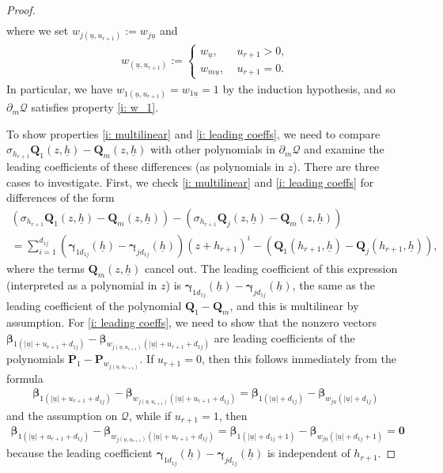 \documentclass[11pt]{amsart}
\theoremstyle{definition}
\newcommand{\CQ}{{\mathcal Q}}
\newcommand{\bp}{{\textbf{P}}}
\newcommand{\q}{{\textbf{Q}}}
\newcommand{\bgamma}{{\boldsymbol{\gamma}}}
\newcommand{\bbeta}{{\boldsymbol{\beta}}}
\newcommand{\uh}{{\underline{h}}}
\newcommand{\uu}{{\underline{u}}}
\begin{document}
\begin{proof}
\begin{multline}
        \end{multline}
        where we set $w_{j(\uu, u_{r+1})} := w_{j\uu}$ and 
        \begin{align*}
            w_{(\uu, u_{r+1})} := \begin{cases} w_\uu,\; &u_{r+1}>0,\\
            w_{m\uu},\; &u_{r+1} = 0. 
            \end{cases}
        \end{align*}
      In particular, we have $w_{1(\uu, u_{r+1})} = w_{1\uu}= 1$ by the induction hypothesis, and so $\partial_m \CQ$ satisfies property \eqref{i: w_1}.
                
        
        
        To show properties \eqref{i: multilinear} and \eqref{i: leading coeffs},
        we need to compare $\sigma_{h_{r+1}}{\q}_1(z,\uh)-{\q}_m(z,\uh)$ with other polynomials in $\partial_m \CQ$ and examine the leading coefficients of these differences (as polynomials in $z$).
       There are three cases to investigate. First, we check \eqref{i: multilinear} and \eqref{i: leading coeffs} for differences of the form
        \begin{multline}\label{E: first case PET}
            (\sigma_{h_{r+1}}{\q}_1(z,\uh)-{\q}_m(z,\uh)) - (\sigma_{h_{r+1}}{\q}_j(z,\uh)-{\q}_m(z,\uh))\\
            = \sum_{i=1}^{d_{1j}}(\bgamma_{1d_{1j}}(\uh)-\bgamma_{jd_{1j}}(\uh))(z+h_{r+1})^i - (\q_1(h_{r+1},\uh) - \q_j(h_{r+1},\uh)),
        \end{multline}
        where the terms ${\q}_m(z,\uh)$ cancel out.
        The leading coefficient of this expression (interpreted as a polynomial in $z$) is $\bgamma_{1d_{1j}}(\uh)-\bgamma_{jd_{1j}}(\uh)$, the same as the leading coefficient of the polynomial $\q_1 - \q_m$, and this is multilinear by assumption.  For \eqref{i: leading coeffs}, we need to show that the nonzero vectors 
        $\bbeta_{1(|\uu|+ u_{r+1}+d_{1j})}-\bbeta_{w_{j(\uu, u_{r+1})}(|\uu|+u_{r+1}+d_{1j})}$ 
        are leading coefficients of the polynomials $\bp_1-\bp_{w_{j(\uu, u_{r+1})}}$. If $u_{r+1}=0$, then this follows immediately from the formula 
        \begin{align*}
            \bbeta_{1(|\uu|+ u_{r+1}+d_{1j})}-\bbeta_{w_{j(\uu, u_{r+1})}(|\uu|+u_{r+1}+d_{1j})} = \bbeta_{1(|\uu|+d_{1j})}-\bbeta_{w_{j\uu}(|\uu|+d_{1j})}
        \end{align*}
        and the assumption on $\CQ$, while if $u_{r+1} = 1$, then 
        \begin{align*}
            \bbeta_{1(|\uu|+ u_{r+1}+d_{1j})}-\bbeta_{w_{j(\uu, u_{r+1})}(|\uu|+u_{r+1}+d_{1j})} = \bbeta_{1(|\uu|+d_{1j}+1)}-\bbeta_{w_{j\uu}(|\uu|+d_{1j}+1)}=\mathbf{0}
        \end{align*}
        because the leading coefficient $\bgamma_{1d_{1j}}(\uh)-\bgamma_{jd_{1j}}(\uh)$ is independent of $h_{r+1}$.


\end{proof}
\end{document}

